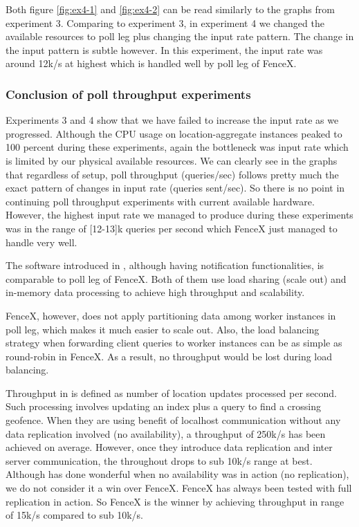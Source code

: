 \documentclass[a4]{report}
\begin{document}
    Both figure \ref{fig:ex4-1} and \ref{fig:ex4-2} can be read similarly to the graphs from experiment 3.
    Comparing to experiment 3, in experiment 4 we changed the available resources to poll leg plus changing the input
    rate pattern.
    The change in the input pattern is subtle however.
    In this experiment, the input rate was around 12k/s at highest which is handled well by poll leg of FenceX.

    \subsubsection{Conclusion of poll throughput experiments}
    Experiments 3 and 4 show that we have failed to increase the input rate as we progressed.
    Although the CPU usage on location-aggregate instances peaked to 100 percent during these experiments,
    again the bottleneck was input rate which is limited by our physical available resources.
    We can clearly see in the graphs that regardless of setup, poll throughput (queries/sec) follows pretty
    much the exact pattern of changes in input rate (queries sent/sec).
    So there is no point in continuing poll throughput experiments with current available hardware.
    However, the highest input rate we managed to produce during these experiments was in the range of [12-13]k queries
    per second which FenceX just managed to handle very well.

    The software introduced in \cite{Cirillo-Jacobs-Martin-Szczytowski-2014}, although having notification
    functionalities, is comparable to poll leg of FenceX.
    Both of them use load sharing (scale out) and in-memory data processing to achieve high throughput and
    scalability.

    FenceX, however, does not apply partitioning data among worker instances in poll leg, which makes it much easier to
    scale out.
    Also, the load balancing strategy when forwarding client queries to worker instances can be as simple as
    round-robin in FenceX.
    As a result, no throughput would be lost during load balancing.

    Throughput in \cite{Cirillo-Jacobs-Martin-Szczytowski-2014} is defined as number of location updates processed per second.
    Such processing involves updating an index plus a query to find a crossing geofence.
    When they are using benefit of localhost communication without any data replication involved (no availability), a
    throughput of 250k/s has been achieved on average.
    However, once they introduce data replication and inter server communication, the throughout drops to sub 10k/s
    range at best.
    Although \cite{Cirillo-Jacobs-Martin-Szczytowski-2014} has done wonderful when no availability was in action (no
    replication), we do not consider it a win over FenceX.
    FenceX has always been tested with full replication in action.
    So FenceX is the winner by achieving throughput in range of 15k/s compared to sub 10k/s.
\end{document}
